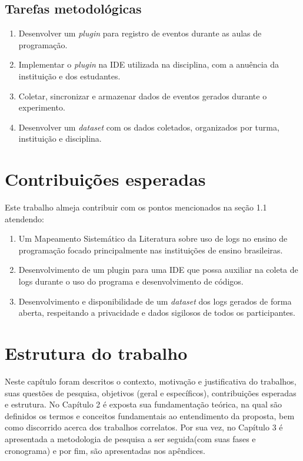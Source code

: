 \subsection{Tarefas metodológicas}\label{subsec:tarefas-metodologicas}
\begin{enumerate}
	\item Desenvolver um \textit{plugin} para registro de eventos durante as aulas de programação.
	\item Implementar o \textit{plugin} na IDE utilizada na disciplina, com a anuência da instituição e dos estudantes.
	\item Coletar, sincronizar e armazenar dados de eventos gerados durante o experimento.
	\item Desenvolver um \textit{dataset} com os dados coletados, organizados por turma, instituição e disciplina.
\end{enumerate}

\section{Contribuições esperadas}\label{sec:contribuicoes}

Este trabalho almeja contribuir com os pontos mencionados na seção 1.1 atendendo: 

\begin{enumerate}
    \item Um Mapeamento Sistemático da Literatura sobre uso de logs no ensino de programação focado 
    principalmente nas instituições de ensino brasileiras. 
     \item Desenvolvimento de um plugin para uma IDE que possa auxiliar na coleta de logs durante o uso do 
     programa e desenvolvimento de códigos.
     \item Desenvolvimento e disponibilidade de um \textit{dataset} dos logs gerados de forma aberta, respeitando a 
     privacidade e dados sigilosos de todos os participantes. 
\end{enumerate}
\section{Estrutura do trabalho}\label{sec:estrutura-trabalho}

Neste capítulo foram descritos o contexto, motivação e justificativa do trabalhos, suas questões de pesquisa, 
objetivos (geral e específicos), contribuições esperadas e estrutura. No Capítulo 2 é exposta sua fundamentação 
teórica, na qual são definidos os termos e conceitos fundamentais ao entendimento da proposta, bem como 
discorrido acerca dos trabalhos correlatos. Por sua vez, no Capítulo 3 é apresentada a metodologia de pesquisa 
a ser seguida(com suas fases e cronograma) e por fim, são apresentadas nos apêndices. 